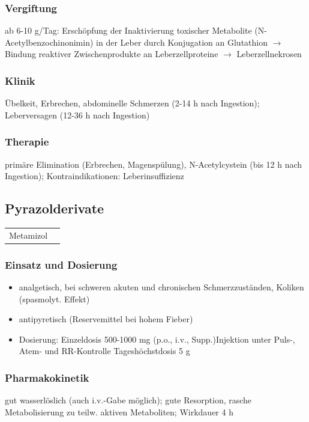 \documentclass[10pt,a4paper]{report}
\begin{document}
\subsubsection{Vergiftung} %
\label{par:vergiftung}
ab 6-10 g/Tag: 	Erschöpfung der Inaktivierung toxischer Metabolite (N-Acetylbenzochinonimin) in der Leber durch Konjugation an 	Glutathion $\rightarrow$ Bindung reaktiver Zwischenprodukte an Leberzellproteine $\rightarrow$ Leberzellnekrosen
\subsubsection{Klinik} %
\label{par:klinik}
Übelkeit, Erbrechen, abdominelle Schmerzen (2-14 h nach Ingestion); Leberversagen (12-36 h nach Ingestion)
\subsubsection{Therapie} %
\label{par:therapie}
primäre Elimination (Erbrechen, Magenspülung), N-Acetylcystein (bis 12 h nach Ingestion); Kontraindikationen:  Leberinsuffizienz
\subsection{Pyrazolderivate} %
\label{sub:pyrazolderivate}
\begin{tabularx}{\textwidth}{XX}	
Metamizol&\\
\end{tabularx}
\subsubsection{Einsatz und Dosierung} %
\label{par:einsatz_und_dosierung}
\begin{itemize}
	\item analgetisch, 	bei schweren akuten und chronischen Schmerzzuständen, Koliken (spasmolyt. Effekt)
	\item antipyretisch (Reservemittel bei hohem Fieber)
	\item Dosierung: Einzeldosis 500-1000 mg (p.o., i.v., Supp.)Injektion unter Puls-, Atem- und RR-Kontrolle Tageshöchstdosis 5 g
\end{itemize}
\subsubsection{Pharmakokinetik} %
\label{par:pharmakokinetik}
gut wasserlöslich (auch i.v.-Gabe möglich); gute Resorption, rasche Metabolisierung zu teilw. aktiven Metaboliten; Wirkdauer 4 h 
\end{document}
